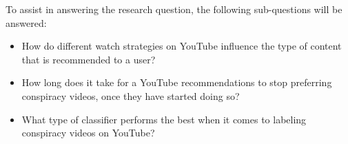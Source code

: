 \documentclass[../main.tex]{subfiles}
\begin{document}
To assist in answering the research question, the following sub-questions will be answered:
\begin{itemize}
    \item How do different watch strategies on YouTube influence the type of content that is recommended to a user?
    \item How long does it take for a YouTube recommendations to stop preferring conspiracy videos, once they have started doing so?
    \item What type of classifier performs the best when it comes to labeling conspiracy videos on YouTube?
\end{itemize}
\end{document}
